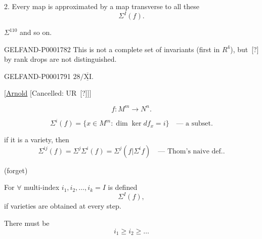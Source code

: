 2. Every map is approximated by a map transverse to all these
\begin{equation*}\Sigma^I (f).\end{equation*}

 $\Sigma^{110}$ and so on.

\begin{GelfandAdjacentEvidence}{GELFAND-P000178}{2}
This is not a complete set of invariants (first in $R^4$), but\, [?] by rank drops are not distinguished.
\end{GelfandAdjacentEvidence}



\begin{GelfandAdjacentEvidence}{GELFAND-P000179}{1}
\underline{$28/\underline{\overline{\mathrm{XI}}}$}.  

[\underline{Arnold} [Cancelled: UR\, [?]]]
\end{GelfandAdjacentEvidence}

\begin{equation*}f: M^m\longrightarrow N^n.\end{equation*}

\begin{equation*}\Sigma^i (f)=\{x\in M^m:\dim\ker df_x=i\}\quad\text{— a subset}.\end{equation*}

if it is a variety, then
\begin{equation*}\Sigma^{ij}(f)=\Sigma^j\Sigma^i (f)=\Sigma^j (f|\Sigma^i f)\quad\text{— Thom's naive def.}.\end{equation*}

(forget)

For $\forall$ multi-index $i_1, i_2,\ldots, i_k=I$ is defined
\begin{equation*}\Sigma^I (f),\end{equation*}
if varieties are obtained at every step.

There must be
\begin{equation*}i_1\ge i_2\ge\ldots\end{equation*}

